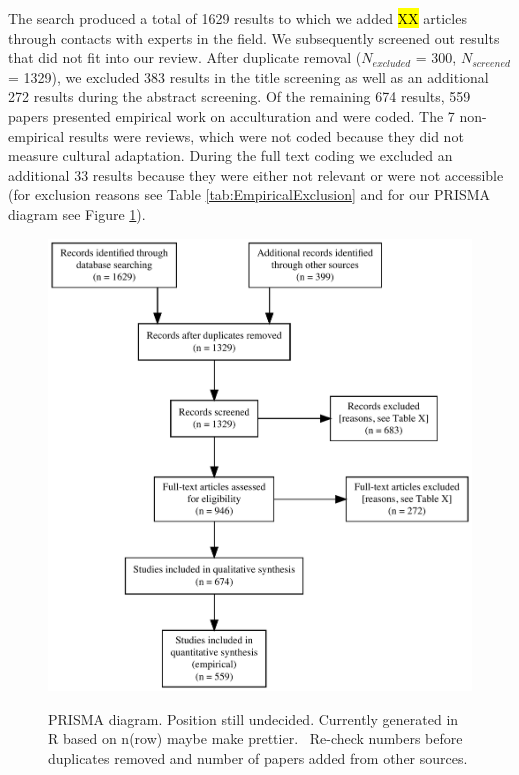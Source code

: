 The search produced a total of 1629 results to which we added \hl{XX}
articles through contacts with experts in the field. We subsequently
screened out results that did not fit into our review. After duplicate
removal (\(N_{excluded}\) = 300, \(N_{screened}\) = 1329), we excluded
383 results in the title screening as well as an additional 272 results
during the abstract screening. Of the remaining 674 results, 559 papers
presented empirical work on acculturation and were coded. The 7
non-empirical results were reviews, which were not coded because they
did not measure cultural adaptation. During the full text coding we
excluded an additional 33 results because they were either not relevant
or were not accessible (for exclusion reasons see Table
\ref{tab:EmpiricalExclusion} and for our PRISMA diagram see Figure
\ref{fig:PRISMA}).

\begin{figure}[h]
\centering
\caption{PRISMA diagram. Position still undecided. Currently generated in R based on n(row) maybe make prettier. \Warning\ Re-check numbers before duplicates removed and number of papers added from other sources.}
\includegraphics[width=\textwidth]{Figures/PRISMA}
\label{fig:PRISMA}
\end{figure}

